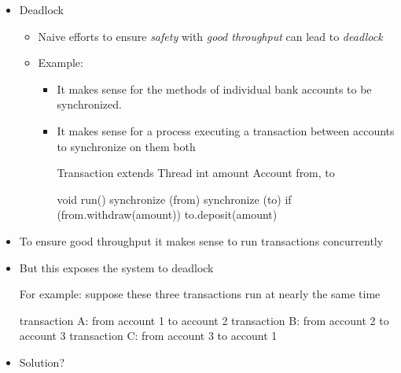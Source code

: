 \documentclass{concdistfoils}
\begin{document}
\begin{slide}
\begin{itemize}
\item Deadlock
\begin{itemize}
\item Naive efforts to ensure \textit{safety} with \textit{good throughput} can lead to \textit{deadlock}
\item Example: 
\begin{itemize}
\item It makes sense for the methods of individual bank accounts to be synchronized.
\item It makes sense for a process executing a transaction between accounts to synchronize on them both
\begin{java}
        Transaction extends Thread
          int     amount
          Account from, to
          
          void run() 
          { synchronize (from)
              synchronize (to) 
              { if (from.withdraw(amount))
                to.deposit(amount)
              }
          }         
\end{java}
\end{itemize}
\end{itemize}
\end{itemize}
\end{slide}

\begin{slide}
\begin{itemize}
\item To ensure good throughput it makes sense to run transactions concurrently
\item But this exposes the system to deadlock
\vfill

For example: suppose these three transactions run at nearly the same time
\begin{java}
        transaction A: from account 1 to account 2
        transaction B: from account 2 to account 3
        transaction C: from account 3 to account 1
\end{java}
\vfill
\item Solution?
\end{itemize}
\end{slide}
\end{document}
